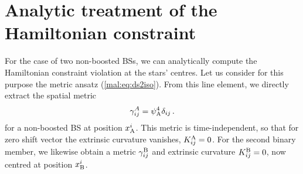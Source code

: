 
\section{Analytic treatment of the Hamiltonian constraint}
\label{mal:sec:hamanalytic}
For the case of two non-boosted BSs, we can analytically
compute the Hamiltonian constraint violation
at the stars' centres. Let us consider for this purpose
the metric ansatz (\ref{mal:eq:ds2iso}). From this line
element, we directly extract the spatial metric
%
%
\begin{equation}
    \gamma_{ij}^{A} = \psi_{\rm A}^4 \delta_{ij}\,.\label{mal:eqn:appendixansatzmetric}
\end{equation}
%
for a non-boosted BS at position $x_{\rm A}^i$.
This metric is time-independent,
so that for zero shift vector the extrinsic curvature vanishes,
%
$K_{ij}^{\rm A} = 0$. 
%
For the second binary member, we likewise obtain a
metric $\gamma^{\rm B}_{ij}$ and extrinsic curvature
$K^{\rm B}_{ij}=0$, now centred at position $x_{\rm B}^i$.


